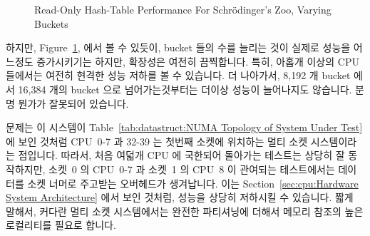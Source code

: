 \begin{figure}[tb]
\centering
{}
\caption{Read-Only Hash-Table Performance For Schr\"odinger's Zoo, Varying Buckets}
\label{fig:datastruct:Read-Only Hash-Table Performance For Schroedinger's Zoo, Varying Buckets}
\end{figure}

하지만,
Figure~\ref{fig:datastruct:Read-Only Hash-Table Performance For Schroedinger's Zoo, Varying Buckets},
에서 볼 수 있듯이, bucket 들의 수를 늘리는 것이 실제로 성능을 어느정도
증가시키기는 하지만, 확장성은 여전히 끔찍합니다.
특히, 아홉개 이상의 CPU 들에서는 여전히 현격한 성능 저하를 볼 수 있습니다.
더 나아가서, 8,192 개 bucket 에서 16,384 개의 bucket 으로 넘어가는것부터는
더이상 성능이 늘어나지도 않습니다.
분명 뭔가가 잘못되어 있습니다.

문제는 이 시스템이
Table~\ref{tab:datastruct:NUMA Topology of System Under Test} 에 보인 것처럼
CPU~0-7 과 32-39 는 첫번째 소켓에 위치하는 멀티 소켓 시스템이라는 점입니다.
따라서, 처음 여덟개 CPU 에 국한되어 돌아가는 테스트는 상당히 잘 동작하지만,
소켓~0 의 CPU~0-7 과 소켓~1 의 CPU~8 이 관여되는 테스트에서는 데이터를 소켓
너머로 주고받는 오버헤드가 생겨납니다.
이는
Section~\ref{sec:cpu:Hardware System Architecture} 에서 보인 것처럼,
성능을 상당히 저하시킬 수 있습니다.
짧게 말해서, 커다란 멀티 소켓 시스템에서는 완전한 파티셔닝에 더해서 메모리
참조의 높은 로컬리티를 필요로 합니다.
\iffalse

